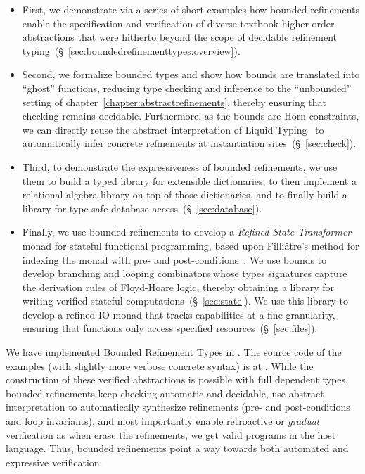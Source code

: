 \begin{itemize}
\item
First, we demonstrate via a series of short examples how bounded refinements
enable the specification and verification of diverse textbook higher order
abstractions that were hitherto beyond the scope of decidable refinement
typing~(\S~\ref{sec:boundedrefinementtypes:overview}).

\item
Second, we formalize bounded types and show how bounds are translated
into ``ghost'' functions, reducing type checking and inference to the
``unbounded'' setting of chapter~\ref{chapter:abstractrefinements}, 
thereby ensuring that checking
remains decidable. Furthermore, as the bounds are Horn constraints, we
can directly reuse the abstract interpretation of Liquid Typing~\citep{LiquidPLDI08}
to automatically infer concrete refinements at instantiation
sites~(\S~\ref{sec:check}).

\item
Third, to demonstrate the expressiveness of bounded refinements, we
use them to build a typed library for extensible dictionaries, to
then implement a relational algebra library on top of those
dictionaries, and to finally build a library for type-safe
database access~(\S~\ref{sec:database}).

\item
Finally, we use bounded refinements to develop a \emph{Refined State Transformer}
monad for stateful functional programming, based upon Filli\^atre's method
for indexing the monad with pre- and post-conditions~\citep{Filliatre98}.
%
We use bounds to develop branching and looping combinators whose types
signatures capture the derivation rules of Floyd-Hoare logic, thereby
obtaining a library for writing verified stateful computations~(\S~\ref{sec:state}).
%
We use this library to develop a refined IO monad that tracks capabilities
at a fine-granularity, ensuring that functions only access specified
resources~(\S~\ref{sec:files}).
\end{itemize}

We have implemented Bounded Refinement Types in \toolname.
The source code of the examples (with slightly more verbose concrete syntax)
is at \cite{liquidhaskellgithub}.
%
While the construction of these verified abstractions is possible with full
dependent types, bounded refinements
%
keep checking automatic and decidable,
%
use abstract interpretation to automatically synthesize
refinements (\ie pre- and post-conditions and loop invariants),
and most importantly
%
enable retroactive or \emph{gradual} verification as when
erase the refinements, we get valid programs in the
host language.
%
Thus, bounded refinements point a way towards 
both automated and expressive verification. 
%
